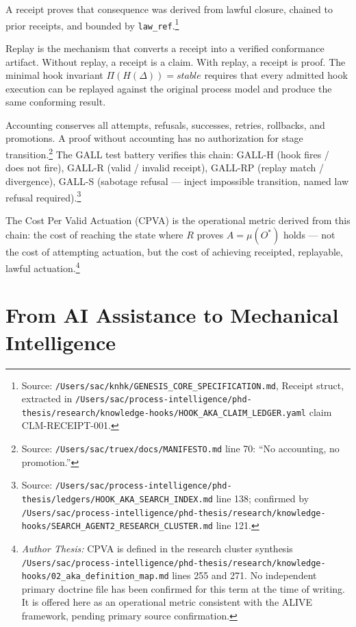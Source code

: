A receipt proves that consequence was derived from lawful closure, chained to prior receipts,
and bounded by \texttt{law\_ref}.\footnote{Source:
\texttt{/Users/sac/knhk/GENESIS\_CORE\_SPECIFICATION.md}, Receipt struct, extracted in
\texttt{/Users/sac/process-intelligence/phd-thesis/research/knowledge-hooks/HOOK\_AKA\_CLAIM\_LEDGER.yaml}
claim CLM-RECEIPT-001.}

Replay is the mechanism that converts a receipt into a verified conformance artifact. Without
replay, a receipt is a claim. With replay, a receipt is proof. The minimal hook invariant
$\Pi(H(\Delta)) = \textit{stable}$ requires that every admitted hook execution can be
replayed against the original process model and produce the same conforming result.

Accounting conserves all attempts, refusals, successes, retries, rollbacks, and promotions.
A proof without accounting has no authorization for stage transition.\footnote{Source:
\texttt{/Users/sac/truex/docs/MANIFESTO.md} line 70: ``No accounting, no promotion.''} The
GALL test battery verifies this chain: GALL-H (hook fires / does not fire), GALL-R (valid
/ invalid receipt), GALL-RP (replay match / divergence), GALL-S (sabotage refusal ---
inject impossible transition, named law refusal required).\footnote{Source:
\texttt{/Users/sac/process-intelligence/phd-thesis/ledgers/HOOK\_AKA\_SEARCH\_INDEX.md} line 138;
confirmed by
\texttt{/Users/sac/process-intelligence/phd-thesis/research/knowledge-hooks/SEARCH\_AGENT2\_RESEARCH\_CLUSTER.md}
line 121.}

The Cost Per Valid Actuation (CPVA) is the operational metric derived from this chain:
the cost of reaching the state where $R$ proves $A = \mu(O^{*})$ holds --- not the cost
of attempting actuation, but the cost of achieving receipted, replayable, lawful
actuation.\footnote{\textit{Author Thesis:} CPVA is defined in the research cluster synthesis
\texttt{/Users/sac/process-intelligence/phd-thesis/research/knowledge-hooks/02\_aka\_definition\_map.md}
lines 255 and 271. No independent primary doctrine file has been confirmed for this term at
the time of writing. It is offered here as an operational metric consistent with the ALIVE
framework, pending primary source confirmation.}

\section{From AI Assistance to Mechanical Intelligence}
\label{sec:mechanical-intelligence}

